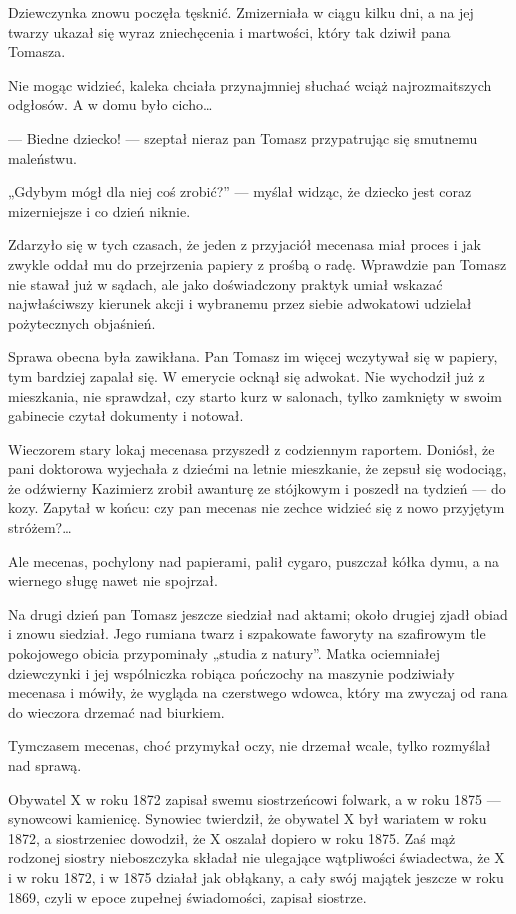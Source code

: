 Dziewczynka znowu poczęła tęsknić. Zmizerniała w ciągu kilku dni, a na
jej twarzy ukazał się wyraz zniechęcenia i martwości, który tak dziwił
pana Tomasza.

Nie mogąc widzieć, kaleka chciała przynajmniej słuchać wciąż
najrozmaitszych odgłosów. A w domu było cicho…

— Biedne dziecko! — szeptał nieraz pan Tomasz przypatrując się
smutnemu maleństwu.

„Gdybym mógł dla niej coś zrobić?” — myślał widząc, że dziecko jest
coraz mizerniejsze i co dzień niknie.

Zdarzyło się w tych czasach, że jeden z przyjaciół mecenasa miał
proces i jak zwykle oddał mu do przejrzenia papiery z prośbą o
radę. Wprawdzie pan Tomasz nie stawał już w sądach, ale jako
doświadczony praktyk umiał wskazać najwłaściwszy kierunek akcji i
wybranemu przez siebie adwokatowi udzielał pożytecznych objaśnień.

Sprawa obecna była zawikłana. Pan Tomasz im więcej wczytywał się w
papiery, tym bardziej zapalał się. W emerycie ocknął się adwokat. Nie
wychodził już z mieszkania, nie sprawdzał, czy starto kurz w salonach,
tylko zamknięty w swoim gabinecie czytał dokumenty i notował.

Wieczorem stary lokaj mecenasa przyszedł z codziennym
raportem. Doniósł, że pani doktorowa wyjechała z dziećmi na letnie
mieszkanie, że zepsuł się wodociąg, że odźwierny Kazimierz zrobił
awanturę ze stójkowym i poszedł na tydzień — do kozy. Zapytał w końcu:
czy pan mecenas nie zechce widzieć się z nowo przyjętym stróżem?…

Ale mecenas, pochylony nad papierami, palił cygaro, puszczał kółka
dymu, a na wiernego sługę nawet nie spojrzał.

Na drugi dzień pan Tomasz jeszcze siedział nad aktami; około drugiej
zjadł obiad i znowu siedział. Jego rumiana twarz i szpakowate faworyty
na szafirowym tle pokojowego obicia przypominały „studia z
natury”. Matka ociemniałej dziewczynki i jej wspólniczka robiąca
pończochy na maszynie podziwiały mecenasa i mówiły, że wygląda na
czerstwego wdowca, który ma zwyczaj od rana do wieczora drzemać nad
biurkiem.

Tymczasem mecenas, choć przymykał oczy, nie drzemał wcale, tylko
rozmyślał nad sprawą.

Obywatel X w roku 1872 zapisał swemu siostrzeńcowi folwark, a w roku
1875 — synowcowi kamienicę. Synowiec twierdził, że obywatel X był
wariatem w roku 1872, a siostrzeniec dowodził, że X oszalał dopiero w
roku 1875. Zaś mąż rodzonej siostry nieboszczyka składał nie ulegające
wątpliwości świadectwa, że X i w roku 1872, i w 1875 działał jak
obłąkany, a cały swój majątek jeszcze w roku 1869, czyli w epoce
zupełnej świadomości, zapisał siostrze.

